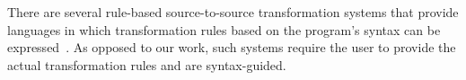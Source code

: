 \documentclass[sigconf,review,anonymous]{acmart}
\begin{document}







There are several rule-based source-to-source transformation systems that provide languages in which
transformation rules based on the program's syntax can be expressed~\cite{stratego,txl}. 
As opposed to our work, such systems require the user to provide the actual transformation rules and are syntax-guided.
\end{document}
